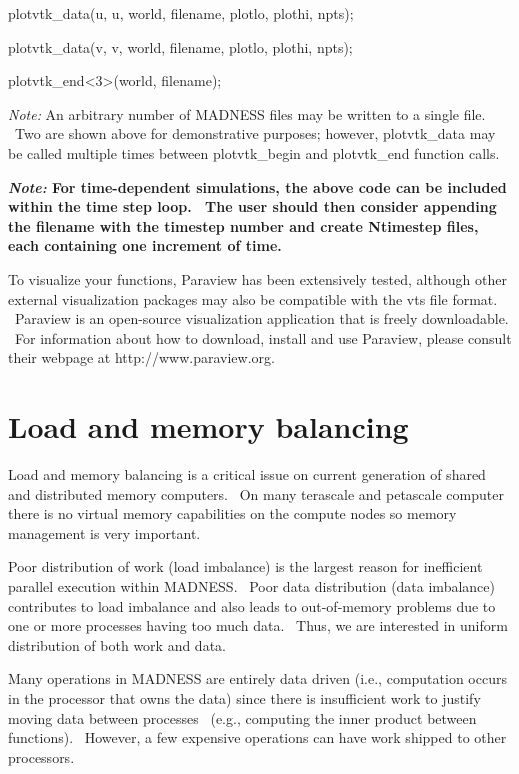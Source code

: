 \documentclass[letterpaper]{article}
\begin{document}
{\ttfamily
plotvtk\_data(u, {\textquotedbl}u{\textquotedbl}, world, filename, plotlo, plothi, npts);}

{\ttfamily
plotvtk\_data(v, {\textquotedbl}v{\textquotedbl}, world, filename, plotlo, plothi, npts);}

{\ttfamily
plotvtk\_end{\textless}3{\textgreater}(world, filename);}


\bigskip

\textit{Note: }An arbitrary number of MADNESS files may be written to a single file. \ Two are shown above for
demonstrative purposes; however, plotvtk\_data may be called multiple times between plotvtk\_begin and plotvtk\_end
function calls.

{\bfseries
\textmd{\textit{Note: }}\textmd{For time-dependent simulations, the above code can be included within the time step
loop. \ The user should then consider appending the filename with the timestep number and create Ntimestep files, each
containing one increment of time.}}

To visualize your functions, Paraview has been extensively tested, although other external visualization packages may
also be compatible with the vts file format. \ Paraview is an open-source visualization application that is freely
downloadable. \ For information about how to download, install and use Paraview, please consult their webpage at
http://www.paraview.org.

\section{Load and memory balancing}
Load and memory balancing is a critical issue on current generation of shared and distributed memory computers. \ On
many terascale and petascale computer there is no virtual memory capabilities on the compute nodes so memory management
is very important.

Poor distribution of work (load imbalance) is the largest reason for inefficient parallel execution within MADNESS.
\ Poor data distribution (data imbalance) contributes to load imbalance and also leads to out-of-memory problems due to
one or more processes having too much data. \ Thus, we are interested in uniform distribution of both work and data. 

Many operations in MADNESS are entirely data driven (i.e., computation occurs in the processor that
{\textquotedbl}owns{\textquotedbl} the data) since there is insufficient work to justify moving data between processes
\ (e.g., computing the inner product between functions). \ However, a few expensive operations can have work shipped to
other processors. 
\end{document}
